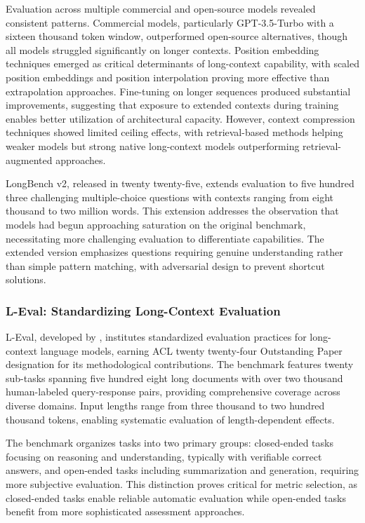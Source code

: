 \documentclass[11pt,letterpaper]{article}
\begin{document}
Evaluation across multiple commercial and open-source models revealed consistent patterns. Commercial models, particularly GPT-3.5-Turbo with a sixteen thousand token window, outperformed open-source alternatives, though all models struggled significantly on longer contexts. Position embedding techniques emerged as critical determinants of long-context capability, with scaled position embeddings and position interpolation proving more effective than extrapolation approaches. Fine-tuning on longer sequences produced substantial improvements, suggesting that exposure to extended contexts during training enables better utilization of architectural capacity. However, context compression techniques showed limited ceiling effects, with retrieval-based methods helping weaker models but strong native long-context models outperforming retrieval-augmented approaches.

LongBench v2, released in twenty twenty-five, extends evaluation to five hundred three challenging multiple-choice questions with contexts ranging from eight thousand to two million words. This extension addresses the observation that models had begun approaching saturation on the original benchmark, necessitating more challenging evaluation to differentiate capabilities. The extended version emphasizes questions requiring genuine understanding rather than simple pattern matching, with adversarial design to prevent shortcut solutions.

\subsubsection{L-Eval: Standardizing Long-Context Evaluation}

L-Eval, developed by \cite{an2024leval}, institutes standardized evaluation practices for long-context language models, earning ACL twenty twenty-four Outstanding Paper designation for its methodological contributions. The benchmark features twenty sub-tasks spanning five hundred eight long documents with over two thousand human-labeled query-response pairs, providing comprehensive coverage across diverse domains. Input lengths range from three thousand to two hundred thousand tokens, enabling systematic evaluation of length-dependent effects.

The benchmark organizes tasks into two primary groups: closed-ended tasks focusing on reasoning and understanding, typically with verifiable correct answers, and open-ended tasks including summarization and generation, requiring more subjective evaluation. This distinction proves critical for metric selection, as closed-ended tasks enable reliable automatic evaluation while open-ended tasks benefit from more sophisticated assessment approaches.
\end{document}
